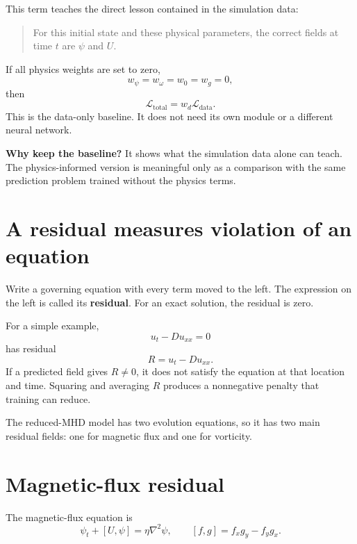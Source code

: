\documentclass[11pt]{article}
\newcommand{\bracket}[2]{\left[#1,#2\right]}
\newcommand{\Ldata}{\mathcal L_{\mathrm{data}}}
\newcommand{\Ltotal}{\mathcal L_{\mathrm{total}}}
\begin{document}
This term teaches the direct lesson contained in the simulation data:
\begin{quote}
For this initial state and these physical parameters, the correct fields at time $t$ are $\psi$ and $U$.
\end{quote}

If all physics weights are set to zero,
\begin{equation}
w_{\psi}=w_{\omega}=w_0=w_g=0,
\end{equation}
then
\begin{equation}
\Ltotal=w_d\Ldata.
\end{equation}
This is the data-only baseline. It does not need its own module or a different neural network.

\begin{notebox}
\textbf{Why keep the baseline?} It shows what the simulation data alone can teach. The physics-informed version is meaningful only as a comparison with the same prediction problem trained without the physics terms.
\end{notebox}

\section{A residual measures violation of an equation}

Write a governing equation with every term moved to the left. The expression on the left is called its \textbf{residual}. For an exact solution, the residual is zero.

For a simple example,
\begin{equation}
u_t-Du_{xx}=0
\end{equation}
has residual
\begin{equation}
R=u_t-Du_{xx}.
\end{equation}
If a predicted field gives $R\ne0$, it does not satisfy the equation at that location and time. Squaring and averaging $R$ produces a nonnegative penalty that training can reduce.

The reduced-MHD model has two evolution equations, so it has two main residual fields: one for magnetic flux and one for vorticity.

\section{Magnetic-flux residual}

The magnetic-flux equation is
\begin{equation}
\psi_t+\bracket{U}{\psi}=\eta\nabla^2\psi,
\qquad
\bracket{f}{g}=f_xg_y-f_yg_x.
\end{equation}
\end{document}
